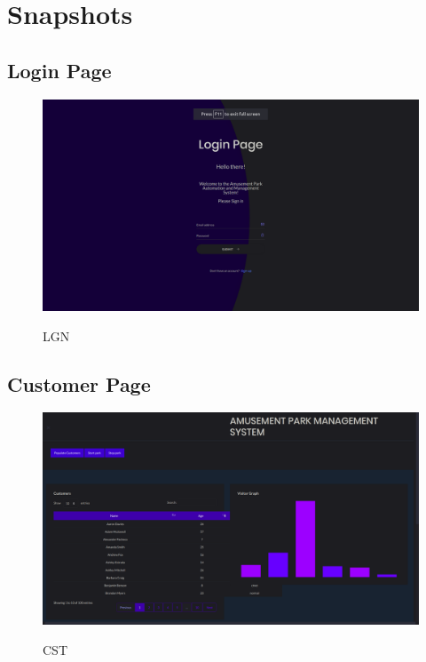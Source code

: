 \chapter{Snapshots}

\section{Login Page}
\begin{figure}[H]
\centering
\caption{LGN}
\includegraphics[scale=.5]{./lgn.png}
\\[0.2in]
\label{fig:ER diagram}
\end{figure}

\thispagestyle{fancy}


\section{Customer Page}
\begin{figure}[H]
\centering
\caption{CST}
\includegraphics[scale=.5]{./cst.png}
\\[0.2in]
\label{fig:ER diagram}
\end{figure}

